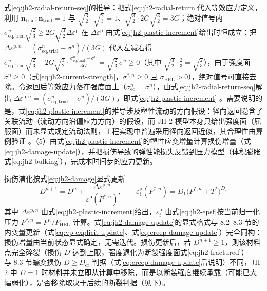 式\eqref{eq:jh2-radial-return-seq}的推导：把式\eqref{eq:jh2-radial-return}代入等效应力定义，利用 $\mathbf{n}_{\mathrm{trial}}:\mathbf{n}_{\mathrm{trial}}=1$ 与 $\sqrt{\tfrac{3}{2}}\cdot\sqrt{\tfrac{2}{3}}=1$、$\sqrt{\tfrac{3}{2}}\cdot 2G\sqrt{\tfrac{3}{2}}=3G$；绝对值号内 $\sigma^{n}_{\mathrm{eq,trial}}\sqrt{\tfrac{2}{3}}\ge2G\sqrt{\tfrac{3}{2}}\Delta\varepsilon^{\mathrm{p}}$ 在 $\Delta\varepsilon^{\mathrm{p}}$ 由式\eqref{eq:jh2-plastic-increment}给出时恒成立：把 $\Delta\varepsilon^{\mathrm{p},n}=(\sigma^{n}_{\mathrm{eq,trial}}-\sigma^{n})/(3G)$ 代入左减右得 $\sigma^{n}_{\mathrm{eq,trial}}\sqrt{\tfrac{2}{3}}-2G\sqrt{\tfrac{3}{2}}\cdot\tfrac{\sigma^{n}_{\mathrm{eq,trial}}-\sigma^{n}}{3G}=\sqrt{\tfrac{2}{3}}\,\sigma^{n}\ge0$（其中 $\sqrt{\tfrac{3}{2}}\cdot\tfrac{2}{3}=\sqrt{\tfrac{2}{3}}$），由于强度面 $\sigma^{n}\ge0$（式\eqref{eq:jh2-current-strength}，$\sigma^{*,n}\ge0$ 且 $\sigma_{\mathrm{HEL}}>0$），绝对值号可直接去除。令返回后等效应力落在强度面上（$\sigma^{n}_{\mathrm{eq}}=\sigma^{n}$），由式\eqref{eq:jh2-radial-return-seq}解出 $\Delta\varepsilon^{\mathrm{p},n}=(\sigma^{n}_{\mathrm{eq,trial}}-\sigma^{n})/(3G)$，即式\eqref{eq:jh2-plastic-increment} \cite{Lai2018,JohnsonHolmquist1994}。需要说明的是，式\eqref{eq:jh2-plastic-increment}的推导涉及塑性流动的方向假设：径向返回隐含了关联流动（流动方向沿偏应力方向）的假设，而 JH-2 模型本身只给出强度面（屈服面）而未显式规定流动法则，工程实现中普遍采用径向返回近似，其合理性由算例验证 \cite{Lai2018,ZhuZhao2021}。（5）由式\eqref{eq:jh2-plastic-increment}的塑性应变增量计算损伤增量（式\eqref{eq:jh2-damage-update}），并把损伤导致的弹性能损失反馈到压力模型（体积膨胀式\eqref{eq:jh2-bulking}），完成本时间步的应力更新。

损伤演化按式\eqref{eq:jh2-damage}显式更新
\begin{equation}
  D^{n+1}=D^{n}+\frac{\Delta\varepsilon^{\mathrm{p},n}}{\varepsilon^{\mathrm{p}}_{\mathrm{f}}(P^{*,n})},
  \qquad
  \varepsilon^{\mathrm{p}}_{\mathrm{f}}(P^{*,n})=D_{1}\bigl(P^{*,n}+T^{*}\bigr)^{D_{2}}
  \label{eq:jh2-damage-update}
\end{equation}
其中 $\Delta\varepsilon^{\mathrm{p},n}$ 由式\eqref{eq:jh2-plastic-increment}给出，$\varepsilon^{\mathrm{p}}_{\mathrm{f}}$ 由式\eqref{eq:jh2-epsf}按当前归一化压力 $P^{*,n}=P^{n}/P_{\mathrm{HEL}}$ 计算。式\eqref{eq:jh2-damage-update}的显式格式与 8.2--8.3 节的内变量更新（式\eqref{eq:vp-explicit-update}、式\eqref{eq:creep-damage-update}）完全同构：损伤增量由当前状态显式确定，无需迭代。损伤更新后，若 $D^{n+1}\ge1$，则该材料点完全碎裂（损伤 $D$ 达到上限，强度退化为断裂强度面式\eqref{eq:jh2-fractured}）——与 8.3 节蠕变损伤 $D\ge D_{\mathrm{cr}}$ 判据（式\eqref{eq:creep-damage-update}后说明）不同，JH-2 中 $D=1$ 时材料并未立即从计算中移除，而是以断裂强度继续承载（可能已大幅弱化），是否移除取决于后续的断裂判据（见下）\cite{JohnsonHolmquist1994}。

